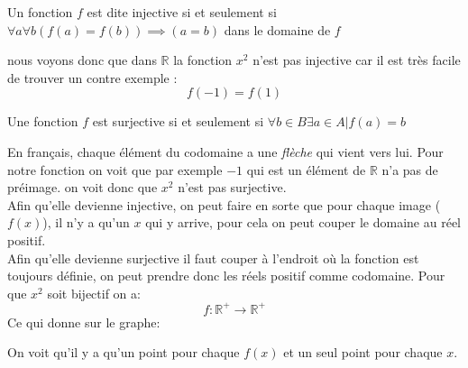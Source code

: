 \begin{definition}[Injectif]
    Un fonction $f$ est dite injective si et seulement si $\forall a\forall b (f(a)  = f(b)) \implies (a = b)$ dans le domaine de $f$
\end{definition}
nous voyons donc que dans $\mathbb{R}$ la fonction $x^2$ n'est pas injective car il est très facile de trouver un contre exemple : 
\begin{equation*}
    f(-1) = f(1)
\end{equation*}
\begin{definition}[surjective]
    Une fonction $f$ est surjective si et seulement si $\forall b \in B \exists a \in A | f(a) = b$ 
\end{definition}
En français, chaque élément du codomaine a une \textit{flèche} qui vient vers lui. Pour notre fonction on voit que par exemple $-1$ qui est un élément de $\mathbb{R}$ n'a pas de préimage. on voit donc que $x^2$ n'est pas surjective.
\\
Afin qu'elle devienne injective, on peut faire en sorte que pour chaque image ($f(x)$), il n'y a qu'un $x$ qui y arrive, pour cela on peut couper le domaine au réel positif.
\\
Afin qu'elle devienne surjective il faut couper à l'endroit où la fonction est toujours définie, on peut prendre donc les réels positif comme codomaine. Pour que $x^2$ soit bijectif on a:
\begin{equation*}
    f: \mathbb{R^+} \to \mathbb{R^+}
\end{equation*}
Ce qui donne sur le graphe:
\begin{center}
\end{center}
On voit qu'il y a qu'un point pour chaque $f(x)$ et un seul point pour chaque $x$.
